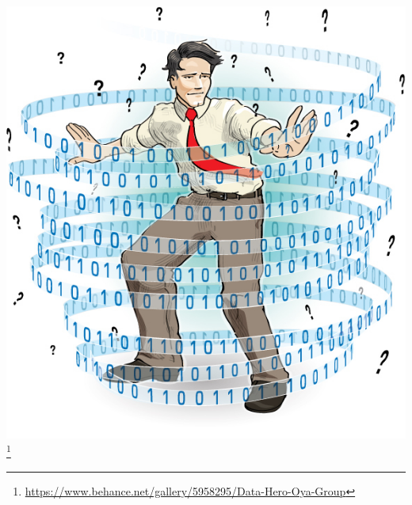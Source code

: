 \documentclass{beamer}
\begin{document}
\begin{frame}{}
    \begin{center}
        \includegraphics[scale=0.5]{dataHero.jpg}\footnote{\url{https://www.behance.net/gallery/5958295/Data-Hero-Oya-Group}}
    \end{center}
\end{frame}
\end{document}
